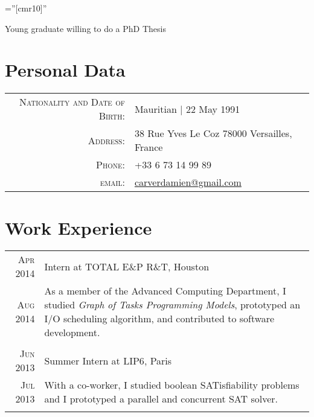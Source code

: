 \documentclass[a4paper,10pt]{article} %
\begin{document}
\pagestyle{empty} %

\font\fb=''[cmr10]'' %


\par{\bigskip\par}
\par{\centering \footnotesize Young graduate willing to do a PhD Thesis \par}

\section{Personal Data}

\begin{tabular}{rl}
	\textsc{Nationality and Date of Birth:} & Mauritian  | 22 May 1991 \\
	\textsc{Address:} & 38 Rue Yves Le Coz 78000 Versailles, France\\
	\textsc{Phone:} & +33 6 73 14 99 89\\
	\textsc{email:} & \href{carverdamien@gmail.com}{carverdamien@gmail.com}
\end{tabular}


\section{Work Experience}

\begin{tabular}{r|p{11cm}}
\textsc{Apr 2014} & Intern at \textsc{TOTAL E\&P R\&T}, Houston\\
\textsc{Aug 2014} & \footnotesize{
						As a member of the Advanced Computing Department, I studied \emph{Graph of Tasks Programming Models}, prototyped an I/O scheduling algorithm, and contributed to software development.
					}\\
\multicolumn{2}{c}{} \\


\textsc{Jun 2013} & Summer Intern at \textsc{LIP6}, Paris\\
\textsc{Jul 2013} & \footnotesize{
						With a co-worker, I studied boolean SATisfiability problems and I prototyped a parallel and concurrent SAT solver.
					}\\
\multicolumn{2}{c}{} \\


\end{tabular}
\end{document}
